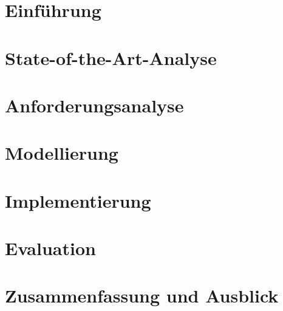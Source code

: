 \documentclass[paper=a4,fontsize=12pt,ngerman,toc=listof, openany]{scrbook}
\begin{document}
\pagestyle{empty} %


% 
% 

\pagestyle{plain} %


\pagestyle{headings} %

\chapter{Einführung}\label{lEinfuehrung}


\chapter{State-of-the-Art-Analyse}\label{lStateOfTheArt}


\chapter{Anforderungsanalyse}\label{lAnforderungsanalyse}


\chapter{Modellierung}\label{lModellierung}


\chapter{Implementierung}\label{lImplementierung}


\chapter{Evaluation}\label{lEvaluation}


\chapter{Zusammenfassung und Ausblick}\label{lZusammenfassung}


\appendix





\end{document}
